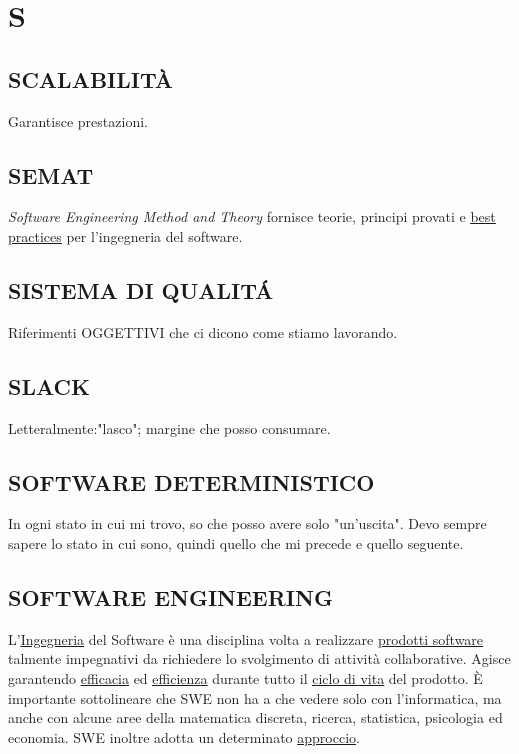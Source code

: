 \newpage
	\section{S} \label{sec:S}
	
		\subsection{SCALABILITÀ}  \label{scalabitlita}
		Garantisce prestazioni.
		
		\subsection{SEMAT}  \label{semat}
			\textit{Software Engineering Method and Theory} fornisce teorie, principi provati e \underline{\hyperref[best]{best practices}} per l'ingegneria del software.
		
		\subsection{SISTEMA DI QUALITÁ}  \label{sistemadiqualita}
		Riferimenti OGGETTIVI che ci dicono come stiamo lavorando.
		
		\subsection{SLACK}  \label{slack}
		Letteralmente:"lasco"; margine che posso consumare.
		
		\subsection{SOFTWARE DETERMINISTICO}  \label{softwaredeterministico} 
		In ogni stato in cui mi trovo, so che posso avere solo "un'uscita". Devo sempre sapere lo stato in cui sono, quindi quello che mi precede e quello seguente.
		
		
		\subsection{SOFTWARE ENGINEERING}  \label{swe}
	     L'\underline{\hyperref[engineering]{Ingegneria}} del Software è una disciplina volta a realizzare  \underline{\hyperref[prodotto]{prodotti software}} talmente impegnativi da richiedere lo svolgimento di attività collaborative. Agisce garantendo \underline{\hyperref[efficacia]{efficacia}} ed \underline{\hyperref[efficienza]{efficienza}} durante tutto il \underline{\hyperref[ciclo]{ciclo di vita}} del prodotto. È importante sottolineare che SWE non ha a che vedere solo con l'informatica, ma anche con alcune aree della matematica discreta, ricerca, statistica, psicologia ed economia. SWE inoltre adotta un determinato \underline{\hyperref[approccio]{approccio}}.
		
